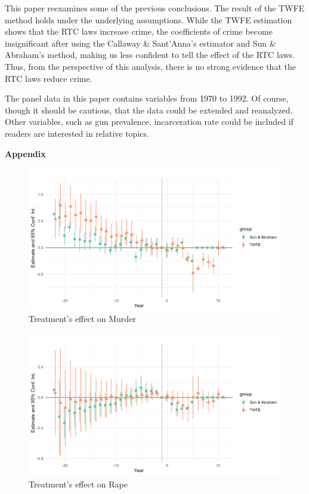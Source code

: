\documentclass{article}
\begin{document}
This paper reexamines some of the previous conclusions. The result of the TWFE method holds under the underlying assumptions. While the TWFE estimation shows that the RTC laws increase crime, the coefficients of crime become insignificant after using the Callaway \& Sant'Anna's estimator and Sun \& Abraham's method, making us less confident to tell the effect of the RTC laws. Thus, from the perspective of this analysis, there is no strong evidence that the RTC laws reduce crime.  

The panel data in this paper contains variables from 1970 to 1992. Of course, though it should be cautious, that the data could be extended and reanalyzed. Other variables, such as gun prevalence, incarceration rate could be included if readers are interested in relative topics. 

\newpage

\printbibliography[title={References}]

\newpage

\appendix

  \begin{center}
    {\bf Appendix}
  \end{center}

\begin{figure}[H]
    \begin{center}
        \includegraphics[width=.85\textwidth]{figures/figure1.png}
    \end{center}
    \caption{Treatment's effect on Murder}
    \label{fig:graph}
\end{figure}

\begin{figure}[H]
    \begin{center}
        \includegraphics[width=.85\textwidth]{figures/figure2.png}
    \end{center}
    \caption{Treatment's effect on Rape}
    \label{fig:graph}
\end{figure}
\end{document}
